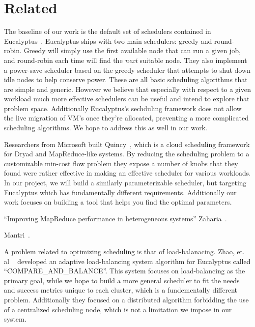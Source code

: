 \section{Related}



The baseline of our work is the default set of schedulers contained in
Eucalyptus~\cite{Eucalyptus}.  Eucalyptus ships with two main schedulers: greedy
and round-robin.  Greedy will simply use the first available node that can run a
given job, and round-robin each time will find the \emph{next} suitable node.
They also implement a power-save scheduler based on the greedy scheduler that
attempts to shut down idle nodes to help conserve power.  These are all basic
scheduling algorithms that are simple and generic.  However we believe that
especially with respect to a given workload much more effective schedulers can
be useful and intend to explore that problem space.  Additionally Eucalyptus's
sechduling framework does not allow the live migration of VM's once they're
allocated, preventing a more complicated scheduling algorithms.  We hope to
address this as well in our work.

Researchers from Microsoft built Quincy~\cite{Quincy}, which is a cloud
scheduling framework for Dryad and MapReduce-like systems.  By reducing the
scheduling problem to a customizable min-cost flow problem they expose a number
of knobs that they found were rather effective in making an effective scheduler
for various workloads.  In our project, we will build a similarly
parameterizable scheduler, but targeting Eucalyptus which has fundamentally
different requirements.  Additionally our work focuses on building a tool that
helps you find the optimal parameters.

``Improving MapReduce performance in heterogeneous systems'' Zaharia~\cite{Zaharia}.

Mantri~\cite{Mantri}.

A problem related to optimizing scheduling is that of load-balanacing.  Zhao,
et. al ~\cite{Zhao} developed an adaptive load-balancing system algorithm for
Eucalyptus called ``COMPARE\_AND\_BALANCE''.  This system focuses on
load-balancing as the primary goal, while we hope to build a more general
scheduler to fit the needs and success metrics unique to each cluster, which is
a fundementally different problem.  Additionally they focused on a distributed
algorithm forbidding the use of a centralized scheduling node, which is not a
limitation we impose in our system.
